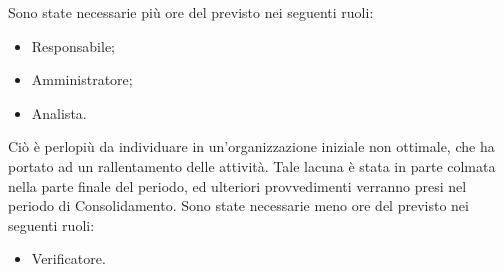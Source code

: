 Sono state necessarie più ore del previsto nei seguenti ruoli:
\begin{itemize}
	\item Responsabile;
	\item Amministratore;
	\item Analista.
\end{itemize}
Ciò è perlopiù da individuare in un'organizzazione iniziale non ottimale, che ha portato ad un rallentamento delle attività. Tale lacuna è stata in parte colmata nella parte finale del periodo, ed ulteriori provvedimenti verranno presi nel periodo di Consolidamento.
\newline
Sono state necessarie meno ore del previsto nei seguenti ruoli:
\begin{itemize}
	\item Verificatore.
\end{itemize}
